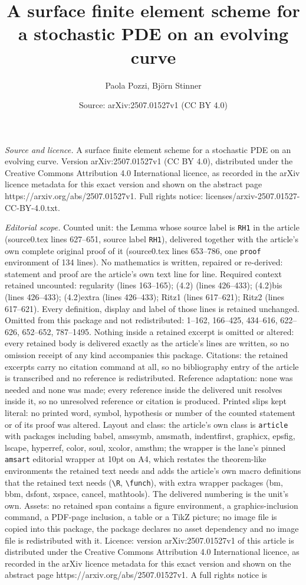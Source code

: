 \documentclass[10pt,a4paper]{amsart}
\title[A surface finite element scheme for a stochastic PDE on an e]{A surface finite element scheme for a stochastic PDE on an evolving curve}
\author{Paola Pozzi, Bj\"orn Stinner}
\date{Source: arXiv:2507.01527v1 (CC BY 4.0)}
\begin{document}
\maketitle

\noindent\emph{Source and licence.} A surface finite element scheme for a stochastic PDE on an evolving curve. Version arXiv:2507.01527v1 (CC BY 4.0), distributed under the Creative Commons Attribution 4.0 International licence, as recorded in the arXiv licence metadata for this exact version and shown on the abstract page https://arxiv.org/abs/2507.01527v1. Full rights notice: licenses/arxiv-2507.01527-CC-BY-4.0.txt.\par\smallskip

\noindent\textit{Editorial scope.} Counted unit: the Lemma whose source label is \texttt{RH1} in the article (source0.tex lines 627--651, source label \texttt{RH1}), delivered together with the article's own complete original proof of it (source0.tex lines 653--786, one \texttt{proof} environment of 134 lines). No mathematics is written, repaired or re-derived: statement and proof are the article's own text line for line. Required context retained uncounted: regularity (lines 163--165); (4.2) (lines 426--433); (4.2)bis (lines 426--433); (4.2)extra (lines 426--433); Ritz1 (lines 617--621); Ritz2 (lines 617--621). Every definition, display and label of those lines is retained unchanged. Omitted from this package and not redistributed: 1--162, 166--425, 434--616, 622--626, 652--652, 787--1495. Nothing inside a retained excerpt is omitted or altered: every retained body is delivered exactly as the article's lines are written, so no omission receipt of any kind accompanies this package. Citations: the retained excerpts carry no citation command at all, so no bibliography entry of the article is transcribed and no reference is redistributed. Reference adaptation: none was needed and none was made; every reference inside the delivered unit resolves inside it, so no unresolved reference or citation is produced. Printed slips kept literal: no printed word, symbol, hypothesis or number of the counted statement or of its proof was altered. Layout and class: the article's own class is \texttt{article} with packages including babel, amssymb, amsmath, indentfirst, graphicx, epsfig, lscape, hyperref, color, soul, xcolor, amsthm; the wrapper is the lane's pinned \texttt{amsart} editorial wrapper at 10pt on A4, which restates the theorem-like environments the retained text needs and adds the article's own macro definitions that the retained text needs (\texttt{\textbackslash R}, \texttt{\textbackslash funch}), with extra wrapper packages (bm, bbm, dsfont, xspace, cancel, mathtools). The delivered numbering is the unit's own. Assets: no retained span contains a figure environment, a graphics-inclusion command, a PDF-page inclusion, a table or a TikZ picture; no image file is copied into this package, the package declares no asset dependency and no image file is redistributed with it. Licence: version arXiv:2507.01527v1 of this article is distributed under the Creative Commons Attribution 4.0 International licence, as recorded in the arXiv licence metadata for this exact version and shown on the abstract page https://arxiv.org/abs/2507.01527v1. A full rights notice is 
\end{document}
